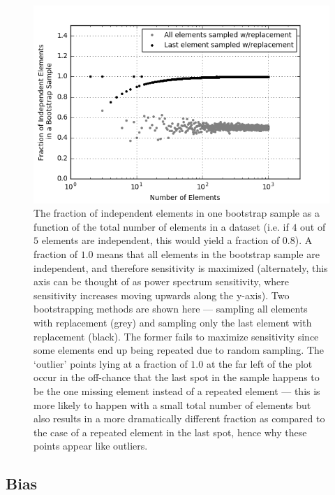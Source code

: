 \documentclass[preprint2,numberedappendix,tighten]{aastex6}  %
\begin{document}
\begin{figure}
	\centering
	\includegraphics[trim={0.3cm 0.3cm 0.3cm 0.3cm},width=\columnwidth]{plots/toy_error2.png}
	\caption{The fraction of independent elements in one bootstrap sample as a function of the total number of elements in a dataset (i.e. if $4$ out of $5$ elements are independent, this would yield a fraction of $0.8$). A fraction of $1.0$ means that all elements in the bootstrap sample are independent, and therefore sensitivity is maximized (alternately, this axis can be thought of as power spectrum sensitivity, where sensitivity increases moving upwards along the y-axis). Two bootstrapping methods are shown here --- sampling all elements with replacement (grey) and sampling only the last element with replacement (black). The former fails to maximize sensitivity since some elements end up being repeated due to random sampling. The `outlier' points lying at a fraction of $1.0$ at the far left of the plot occur in the off-chance that the last spot in the sample happens to be the one missing element instead of a repeated element --- this is more likely to happen with a small total number of elements but also results in a more dramatically different fraction as compared to the case of a repeated element in the last spot, hence why these points appear like outliers.}
	\label{fig:toy_error2}
\end{figure}


\subsection{Bias}
\label{sec:BiasOverview}
\end{document}
